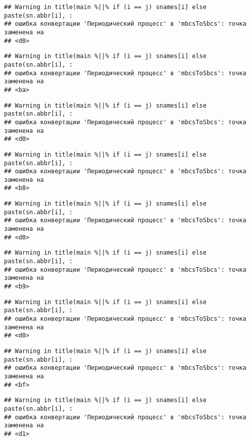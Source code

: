 \documentclass[
]{article}
\begin{document}
\begin{verbatim}
## Warning in title(main %||% if (i == j) snames[i] else paste(sn.abbr[i], :
## ошибка конвертации 'Периодический процесс' в 'mbcsToSbcs': точка заменена на
## <d0>
\end{verbatim}

\begin{verbatim}
## Warning in title(main %||% if (i == j) snames[i] else paste(sn.abbr[i], :
## ошибка конвертации 'Периодический процесс' в 'mbcsToSbcs': точка заменена на
## <ba>
\end{verbatim}

\begin{verbatim}
## Warning in title(main %||% if (i == j) snames[i] else paste(sn.abbr[i], :
## ошибка конвертации 'Периодический процесс' в 'mbcsToSbcs': точка заменена на
## <d0>
\end{verbatim}

\begin{verbatim}
## Warning in title(main %||% if (i == j) snames[i] else paste(sn.abbr[i], :
## ошибка конвертации 'Периодический процесс' в 'mbcsToSbcs': точка заменена на
## <b8>
\end{verbatim}

\begin{verbatim}
## Warning in title(main %||% if (i == j) snames[i] else paste(sn.abbr[i], :
## ошибка конвертации 'Периодический процесс' в 'mbcsToSbcs': точка заменена на
## <d0>
\end{verbatim}

\begin{verbatim}
## Warning in title(main %||% if (i == j) snames[i] else paste(sn.abbr[i], :
## ошибка конвертации 'Периодический процесс' в 'mbcsToSbcs': точка заменена на
## <b9>
\end{verbatim}

\begin{verbatim}
## Warning in title(main %||% if (i == j) snames[i] else paste(sn.abbr[i], :
## ошибка конвертации 'Периодический процесс' в 'mbcsToSbcs': точка заменена на
## <d0>
\end{verbatim}

\begin{verbatim}
## Warning in title(main %||% if (i == j) snames[i] else paste(sn.abbr[i], :
## ошибка конвертации 'Периодический процесс' в 'mbcsToSbcs': точка заменена на
## <bf>
\end{verbatim}

\begin{verbatim}
## Warning in title(main %||% if (i == j) snames[i] else paste(sn.abbr[i], :
## ошибка конвертации 'Периодический процесс' в 'mbcsToSbcs': точка заменена на
## <d1>
\end{verbatim}
\end{document}
